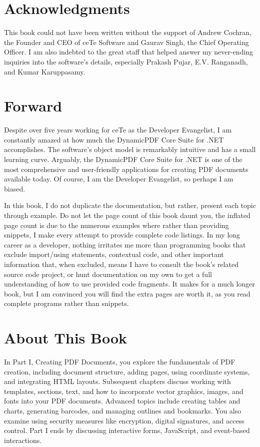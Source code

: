 \documentclass[american]{tufte-book}
\numberwithin{equation}{section}
\numberwithin{figure}{section}
\begin{document}
\chapter*{Acknowledgments}

This book could not have been written without the support of Andrew
Cochran, the Founder and CEO of ceTe Software and Gaurav Singh, the
Chief Operating Officer. I am also indebted to the great staff that
helped answer my never-ending inquiries into the software's details,
especially Prakash Pujar, E.V. Ranganadh, and Kumar Karuppasamy.

\chapter*{Forward}

Despite over five years working for ceTe as the Developer Evangelist,
I am constantly amazed at how much the DynamicPDF Core Suite for .NET
accomplishes. The software’s object model is remarkably intuitive
and has a small learning curve. Arguably, the DynamicPDF Core Suite
for .NET is one of the most comprehensive and user-friendly applications
for creating PDF documents available today. Of course, I am the Developer
Evangelist, so perhaps I am biased. 

In this book, I do not duplicate the documentation, but rather, present
each topic through example. Do not let the page count of this book
daunt you, the inflated page count is due to the numerous examples
where rather than providing snippets, I make every attempt to provide
complete code listings. In my long career as a developer, nothing
irritates me more than programming books that exclude import/using
statements, contextual code, and other important information that,
when excluded, means I have to consult the book’s related source code
project, or hunt documentation on my own to get a full understanding
of how to use provided code fragments. It makes for a much longer
book, but I am convinced you will find the extra pages are worth it,
as you read complete programs rather than snippets.
\chapter*{About This Book} 
In Part I, Creating PDF Documents, you explore the fundamentals of PDF creation, including document structure, adding pages, using coordinate systems, and integrating HTML layouts. Subsequent chapters discuss working with templates, sections, text, and how to incorporate vector graphics, images, and fonts into your PDF documents. Advanced topics include creating tables and charts, generating barcodes, and managing outlines and bookmarks. You also examine using security measures like encryption, digital signatures, and access control. Part I ends by discussing interactive forms, JavaScript, and event-based interactions.
\end{document}
